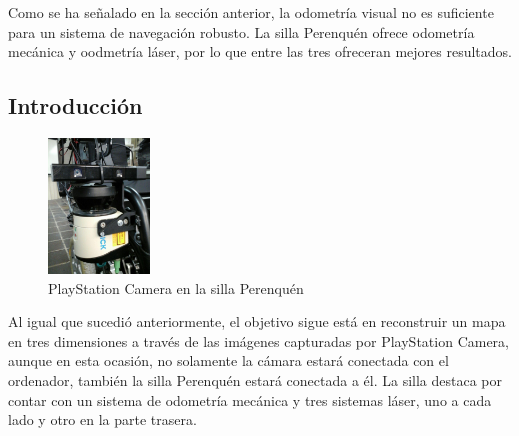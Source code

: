 

Como se ha señalado en la sección anterior, la odometría visual no es suficiente
para un sistema de navegación robusto. La silla Perenquén ofrece odometría
mecánica y oodmetría láser, por lo que entre las tres ofreceran mejores
resultados.

\subsection{Introducción}

\begin{figure}
  \vspace{-20pt}
  \begin{center}
    \includegraphics[width=0.24\textwidth]{images/cap4/Perenquen-camara.eps}
  \end{center}
  \vspace{-20pt}
  \caption{PlayStation Camera en la silla Perenquén}
  \vspace{-10pt}
  \label{fig:Perenquen-Camara}
\end{figure}

Al igual que sucedió anteriormente, el objetivo sigue está en reconstruir un
mapa en tres dimensiones a través de las imágenes capturadas por PlayStation
Camera, aunque en esta ocasión, no solamente la cámara estará conectada con el
ordenador, también la silla Perenquén estará conectada a él. La silla destaca
por contar con un sistema de odometría mecánica y tres sistemas láser, uno a
cada lado y otro en la parte trasera.

